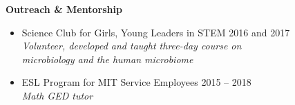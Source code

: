 \documentclass[10pt]{article}
\renewcommand{\section}[1]{\pagebreak[3]%
    \hyphenpenalty=10000%
    \vspace{1.3\baselineskip}%
    \phantomsection\addcontentsline{toc}{section}{#1}%
    \noindent\llap{\scshape\smash{\parbox[t]{\marginparwidth}{\raggedright #1}}}%
    \vspace{-\baselineskip}\par}
\newenvironment{outerlist}[1][\enskip\textbullet]%
        {\begin{itemize}[#1,leftmargin=*]}{\end{itemize}%
         \vspace{-.6\baselineskip}}
\begin{document}
\textbf{Outreach \& Mentorship}
\begin{outerlist}

	\item[] Science Club for Girls, Young Leaders in STEM \hfill {2016 and 2017} \\ \textit{Volunteer, developed and taught three-day course on} \\ \textit{microbiology and the human microbiome} 
	\item[] ESL Program for MIT Service Employees \hfill {2015 -- 2018} \\
	\textit{Math GED tutor}
\end{outerlist}
\vspace{.15in}


%
\end{document}
